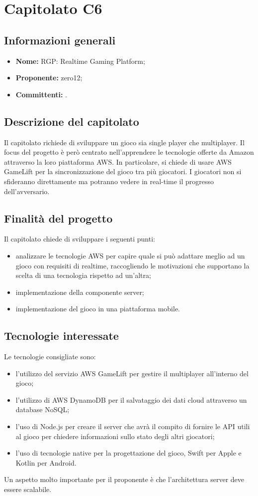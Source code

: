 \section{Capitolato C6}

\subsection{Informazioni generali}
\begin{itemize}
\item \textbf{Nome:} RGP: Realtime Gaming Platform;
\item \textbf{Proponente:} zero12;
\item \textbf{Committenti:} \committenti{}.
\end{itemize}

\subsection{Descrizione del capitolato}
Il capitolato richiede di sviluppare un gioco sia single player che multiplayer.
Il focus del progetto è però centrato nell'apprendere le tecnologie offerte da Amazon attraverso la loro piattaforma AWS.
In particolare, si chiede di usare AWS GameLift per la sincronizzazione del gioco tra più giocatori.
I giocatori non si sfideranno direttamente ma potranno vedere in real-time il progresso dell'avversario.

\subsection{Finalità del progetto}
Il capitolato chiede di sviluppare i seguenti punti:
\begin{itemize}
\item analizzare le tecnologie AWS per capire quale si può adattare meglio ad un gioco con requisiti di realtime, raccogliendo le motivazioni che supportano la scelta di una tecnologia rispetto ad un'altra;
\item implementazione della componente server;
\item implementazione del gioco in una piattaforma mobile.
\end{itemize}

\subsection{Tecnologie interessate}
Le tecnologie consigliate sono:
\begin{itemize}
\item l'utilizzo del servizio AWS GameLift per gestire il multiplayer all'interno del gioco;
\item l'utilizzo di AWS DynamoDB per il salvataggio dei dati cloud attraverso un database NoSQL;
\item l'uso di Node.js per creare il server che avrà il compito di fornire le API utili al gioco per chiedere informazioni sullo stato degli altri giocatori;
\item l'uso di tecnologie native per la progettazione del gioco, Swift per Apple e Kotlin per Android.
\end{itemize}
Un aspetto molto importante per il proponente è che l'architettura server deve essere scalabile.

